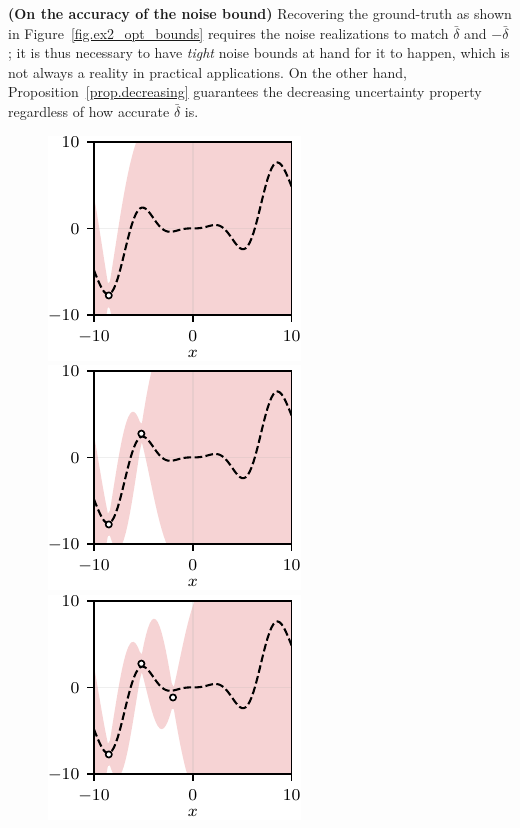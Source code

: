 \begin{remark}
	\textbf{(On the accuracy of the noise bound)}
	Recovering the ground-truth as shown in Figure~\ref{fig.ex2_opt_bounds} requires the noise realizations to match $\bar \delta$ and $-\bar \delta$; it is thus necessary to have \textit{tight} noise bounds at hand for it to happen, which is not always a reality in practical applications. On the other hand, Proposition~\ref{prop.decreasing} guarantees the decreasing uncertainty property regardless of how accurate $\bar \delta$ is.
\end{remark}

\begin{figure}[h]
	\centering
	\vspace{10pt}
	\includegraphics{../images/chap2_ex3_opt_bounds_A.pdf} 
	\includegraphics{../images/chap2_ex3_opt_bounds_B.pdf} 
	\includegraphics{../images/chap2_ex3_opt_bounds_C.pdf}  \\[4pt]

\end{figure}
